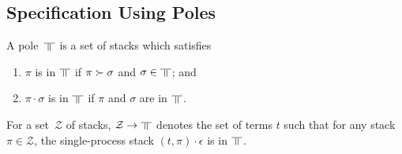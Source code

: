 \subsection{Specification Using Poles}


\begin{definition}
 \label{ex:def:pole}
A pole~$\bbot$ is a set of stacks
which satisfies
\begin{enumerate}
 \item \label{ex:red-closed} $\pi$ is in $\bbot$ if $\pi\succ \sigma$ and
       $\sigma\in\bbot$; and
 \item \label{ex:conc-closed} $\pi\cdot \sigma$ is in $\bbot$ if $\pi$
       and $\sigma$ are in $\bbot$.
\end{enumerate}
\end{definition}

For a set~$\mathcal Z$ of
stacks, $\mathcal Z\rightarrow\bbot$ denotes
the set of
terms
$t$ such that
for any
stack $\pi\in\mathcal Z$,
the single-process stack $(t,\pi)\cdot\epsilon$ is in $\bbot$.



